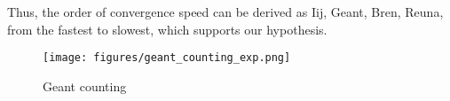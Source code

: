 Thus, the order of convergence speed can be derived as Iij, Geant, Bren, Reuna, from the fastest to slowest, which supports our hypothesis.

\begin{figure}[h!]
    \begin{center}
    \texttt{[image: figures/geant\_counting\_exp.png]}
    \end{center}
    \caption{Geant counting}
    \label{fig:geant}
\end{figure}
\label{sec:results}

